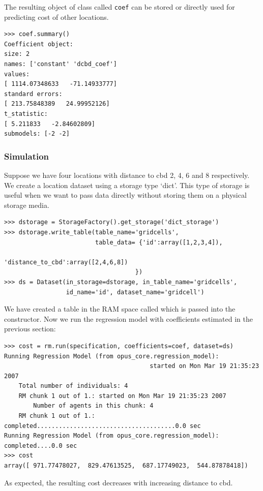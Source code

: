 The resulting object of class  \coefficientsindex called \verb|coef| can be stored or
directly used for predicting cost of other locations.
\coefficientsindex
\begin{verbatim}
>>> coef.summary()
Coefficient object:
size: 2
names: ['constant' 'dcbd_coef']
values:
[ 1114.07348633   -71.14933777]
standard errors:
[ 213.75848389   24.99952126]
t_statistic:
[ 5.211833   -2.84602809]
submodels: [-2 -2]
\end{verbatim}

%
\subsubsection{Simulation}
%
Suppose we have four locations with distance to cbd 2, 4, 6 and 8
respectively. We create a location dataset \datasetindex using
a storage type `dict'.
This type of storage is useful when we want to pass data directly without storing them on a physical storage media.

\begin{verbatim}
>>> dstorage = StorageFactory().get_storage('dict_storage')
>>> dstorage.write_table(table_name='gridcells',
                         table_data= {'id':array([1,2,3,4]),
                                      'distance_to_cbd':array([2,4,6,8])
                                    })
>>> ds = Dataset(in_storage=dstorage, in_table_name='gridcells',
                 id_name='id', dataset_name='gridcell')
\end{verbatim}
We have created a table in the RAM space called  which is passed into the  constructor.
Now we run the regression model with coefficients \coefficientsindex estimated in the previous
section:
\coefficientsindex \datasetindex
\begin{verbatim}
>>> cost = rm.run(specification, coefficients=coef, dataset=ds)
Running Regression Model (from opus_core.regression_model):
                                        started on Mon Mar 19 21:35:23 2007
    Total number of individuals: 4
    RM chunk 1 out of 1.: started on Mon Mar 19 21:35:23 2007
        Number of agents in this chunk: 4
    RM chunk 1 out of 1.: completed......................................0.0 sec
Running Regression Model (from opus_core.regression_model): completed....0.0 sec
>>> cost
array([ 971.77478027,  829.47613525,  687.17749023,  544.87878418])
\end{verbatim}
As expected, the resulting cost decreases with increasing distance to cbd.

